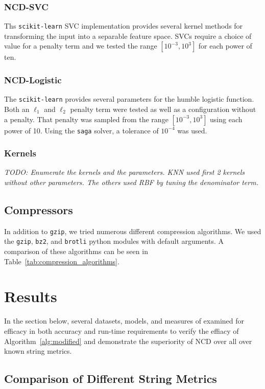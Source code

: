\documentclass[conference]{IEEEtran}
\newcommand{\cm}[1]{\textit{{\color{blue}#1}}}
\begin{document}
\subsubsection{NCD-SVC}
Ths \texttt{scikit-learn} SVC implementation provides several kernel methods for transforming the input into a separable feature space. 
SVCs require a choice of value for a penalty term and we tested the range $[ 10^{-3}, 10^3]$ for each power of ten. 

\subsubsection{NCD-Logistic}
The \texttt{scikit-learn} provides several parameters for the humble logistic function. 
Both an $\ell_1$ and $\ell_2$ penalty term were tested as well as a configuration without a penalty. That penalty was sampled from the range $[10^{-3}, 10^3]$ using each power of 10. 
Using the \texttt{saga} solver, a tolerance of $10^{-4}$ was used.

\subsubsection{Kernels}
\cm{TODO: Enumerate the kernels and the parameters. KNN used first 2 kernels without other parameters. The others used RBF by tuning the denominator term.}

\subsection{Compressors}
\label{compressors}
In addition to \texttt{gzip}, we tried numerous different compression algorithms. We used the \texttt{gzip},  \texttt{bz2}, and \texttt{brotli} python modules with default arguments. A comparison of these algorithms can be seen in Table~\ref{tab:compression_algorithms}.



\section{Results}
\label{results}
In the section below, several datasets, models, and measures of examined for efficacy in both accuracy and run-time requirements to verify the effiacy of Algorithm~\ref{alg:modified} and demonstrate the superiority of NCD over all over known string metrics.

\subsection{Comparison of Different String Metrics}
\end{document}
